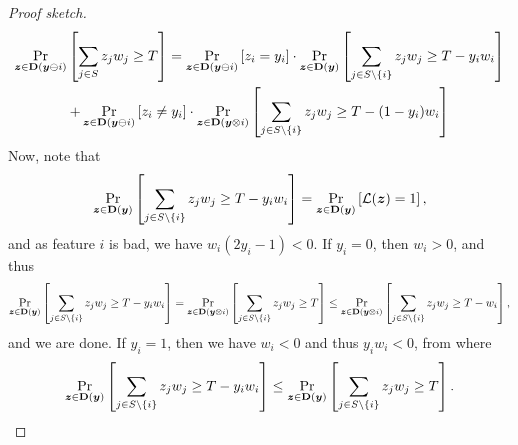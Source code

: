 \begin{proof}[Proof sketch]
    \begin{multline*}
        \Pr_{{\bm{z}} \in \mathbf{D}({\bm{y}} \ominus i)}\left[\sum_{j\in S} z_j w_j \geq T\right] = \Pr_{{\bm{z}} \in \mathbf{D}({\bm{y}}  \ominus i)}\left[z_i = y_i\right] \cdot \Pr_{{\bm{z}} \in \mathbf{D}({\bm{y}})}\left[\sum_{j \in S \setminus \{i\}} z_j w_j \geq T- y_i w_i\right]
                                                         \\   +  \Pr_{{\bm{z}} \in \mathbf{D}({\bm{y}}  \ominus i)}\left[z_i \neq y_i\right] \cdot \Pr_{{\bm{z}} \in \mathbf{D}({\bm{y}} \otimes i)}\left[\sum_{j \in S \setminus \{i\}} z_j w_j \geq T - (1-y_i)w_i\right]
\end{multline*}
Now, note that 
\[
    \Pr_{{\bm{z}} \in \mathbf{D}({\bm{y}})}\left[\sum_{j \in S \setminus \{i\}} z_j w_j \geq T- y_i w_i\right] =   \Pr_{{\bm{z}} \in \mathbf{D}({\bm{y}})}\left[\mathcal{L}({\bm{z}}) = 1\right],
\]
and as feature $i$ is bad, we have $w_i(2y_i - 1) < 0$. If $y_i = 0$, then $w_i > 0$, and thus 
\[
    \Pr_{{\bm{z}} \in \mathbf{D}({\bm{y}})}\left[\sum_{j \in S \setminus \{i\}} z_j w_j \geq T- y_i w_i\right] = \Pr_{{\bm{z}} \in \mathbf{D}({\bm{y}} \otimes i)}\left[\sum_{j \in S \setminus \{i\}} z_j w_j \geq T\right] \leq \Pr_{{\bm{z}} \in \mathbf{D}({\bm{y}} \otimes i)}\left[\sum_{j \in S \setminus \{i\}} z_j w_j \geq T - w_i\right],
\]
and we are done. If $y_i = 1$, then we have $w_i < 0$ and thus $y_i w_i< 0$, from where  
\[
    \Pr_{{\bm{z}} \in \mathbf{D}({\bm{y}})}\left[\sum_{j \in S \setminus \{i\}} z_j w_j \geq T- y_i w_i\right] \leq \Pr_{{\bm{z}} \in \mathbf{D}({\bm{y}})}\left[\sum_{j \in S \setminus \{i\}} z_j w_j \geq T\right].
\]
    
\end{proof}